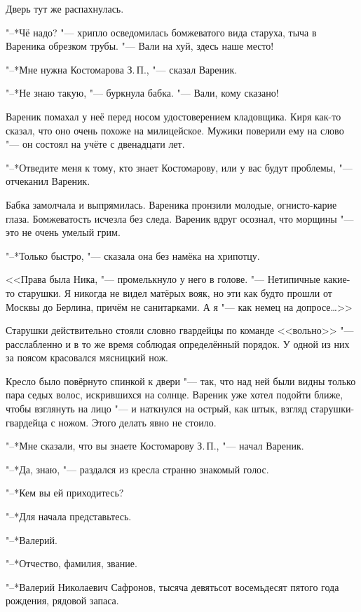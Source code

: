 Дверь тут же распахнулась.

"--*Чё надо? "--- хрипло осведомилась бомжеватого вида старуха, тыча в Вареника обрезком трубы.
"--- Вали на хуй, здесь наше место!

"--*Мне нужна Костомарова З.\,П., "--- сказал Вареник.

"--*Не знаю такую, "--- буркнула бабка.
"--- Вали, кому сказано!

Вареник помахал у неё перед носом удостоверением кладовщика.
Киря как-то сказал, что оно очень похоже на милицейское.
Мужики поверили ему на слово "--- он состоял на учёте с двенадцати лет.

"--*Отведите меня к тому, кто знает Костомарову, или у вас будут проблемы, "--- отчеканил Вареник.

Бабка замолчала и выпрямилась.
Вареника пронзили молодые, огнисто-карие глаза.
Бомжеватость исчезла без следа.
Вареник вдруг осознал, что морщины "--- это не очень умелый грим.

"--*Только быстро, "--- сказала она без намёка на хрипотцу.

\asterism

\textspace

<<Права была Ника, "--- промелькнуло у него в голове.
"--- Нетипичные какие-то старушки.
Я никогда не видел матёрых вояк, но эти как будто прошли от Москвы до Берлина, причём не санитарками.
А я "--- как немец на допросе\ldots{}>>

Старушки действительно стояли словно гвардейцы по команде <<вольно>> "--- расслабленно и в то же время соблюдая определённый порядок.
У одной из них за поясом красовался мясницкий нож.

Кресло было повёрнуто спинкой к двери "--- так, что над ней были видны только пара седых волос, искрившихся на солнце.
Вареник уже хотел подойти ближе, чтобы взглянуть на лицо "--- и наткнулся на острый, как штык, взгляд старушки-гвардейца с ножом.
Этого делать явно не стоило.

"--*Мне сказали, что вы знаете Костомарову З.\,П., "--- начал Вареник.

"--*Да, знаю, "--- раздался из кресла странно знакомый голос.

"--*Кем вы ей приходитесь?

"--*Для начала представьтесь.

"--*Валерий.

"--*Отчество, фамилия, звание.

"--*Валерий Николаевич Сафронов, тысяча девятьсот восемьдесят пятого года рождения, рядовой запаса.

